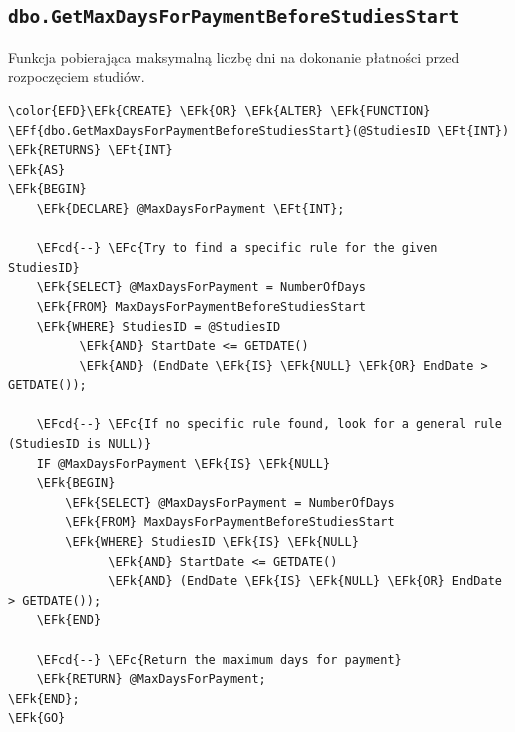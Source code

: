 \documentclass[11pt]{article}
\newcommand{\EFc}[1]{\textcolor{EFc}{\textit{#1}}} %
\newcommand{\EFcd}[1]{\textcolor{EFcd}{\textit{#1}}} %
\newcommand{\EFk}[1]{\textcolor{EFk}{\textbf{#1}}} %
\newcommand{\EFf}[1]{\textcolor{EFf}{#1}} %
\newcommand{\EFt}[1]{\textcolor{EFt}{\textbf{#1}}} %
\begin{document}
\subsection{\texttt{dbo.GetMaxDaysForPaymentBeforeStudiesStart}}
\label{sec:org9714ed3}
Funkcja pobierająca maksymalną liczbę dni na dokonanie płatności przed rozpoczęciem studiów.
\begin{Code}
\begin{Verbatim}
\color{EFD}\EFk{CREATE} \EFk{OR} \EFk{ALTER} \EFk{FUNCTION} \EFf{dbo.GetMaxDaysForPaymentBeforeStudiesStart}(@StudiesID \EFt{INT})
\EFk{RETURNS} \EFt{INT}
\EFk{AS}
\EFk{BEGIN}
    \EFk{DECLARE} @MaxDaysForPayment \EFt{INT};

    \EFcd{--} \EFc{Try to find a specific rule for the given StudiesID}
    \EFk{SELECT} @MaxDaysForPayment = NumberOfDays
    \EFk{FROM} MaxDaysForPaymentBeforeStudiesStart
    \EFk{WHERE} StudiesID = @StudiesID
          \EFk{AND} StartDate <= GETDATE()
          \EFk{AND} (EndDate \EFk{IS} \EFk{NULL} \EFk{OR} EndDate > GETDATE());

    \EFcd{--} \EFc{If no specific rule found, look for a general rule (StudiesID is NULL)}
    IF @MaxDaysForPayment \EFk{IS} \EFk{NULL}
    \EFk{BEGIN}
        \EFk{SELECT} @MaxDaysForPayment = NumberOfDays
        \EFk{FROM} MaxDaysForPaymentBeforeStudiesStart
        \EFk{WHERE} StudiesID \EFk{IS} \EFk{NULL}
              \EFk{AND} StartDate <= GETDATE()
              \EFk{AND} (EndDate \EFk{IS} \EFk{NULL} \EFk{OR} EndDate > GETDATE());
    \EFk{END}

    \EFcd{--} \EFc{Return the maximum days for payment}
    \EFk{RETURN} @MaxDaysForPayment;
\EFk{END};
\EFk{GO}
\end{Verbatim}
\end{Code}
\end{document}
